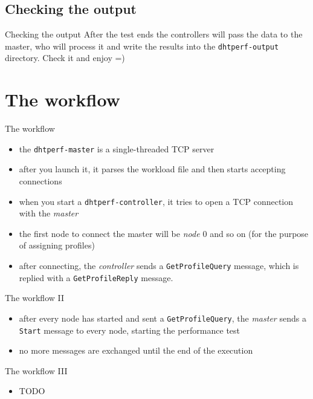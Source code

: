 \documentclass[compress]{beamer}
\begin{document}
\subsection{Checking the output}
\begin{frame}{Checking the output}
After the test ends the controllers will pass the data to the master, who
will process it and write the results into the \texttt{dhtperf-output}
directory. Check it and enjoy =)
\end{frame}

\section{The workflow}
\begin{frame}{The workflow}
\begin{itemize}
    \item the \texttt{dhtperf-master} is a single-threaded TCP server
    \item after you launch it, it parses the workload file and then starts
    accepting connections
    \item when you start a \texttt{dhtperf-controller}, it tries to open a TCP
    connection with the \emph{master}
    \item the first node to connect the master will be \emph{node $0$} and so
    on (for the purpose of assigning profiles)
    \item after connecting, the \emph{controller} sends a
    \texttt{GetProfileQuery} message, which is replied with a
    \texttt{GetProfileReply} message.
\end{itemize}
\end{frame}
\begin{frame}{The workflow II}
\begin{itemize}
    \item after every node has started and sent a \texttt{GetProfileQuery}, the
    \emph{master} sends a \texttt{Start} message to every node, starting the
    performance test
    \item no more messages are exchanged until the end of the execution
\end{itemize}
\end{frame}

\begin{frame}{The workflow III}
\begin{itemize}
    \item TODO
\end{itemize}
\end{frame}
\end{document}
